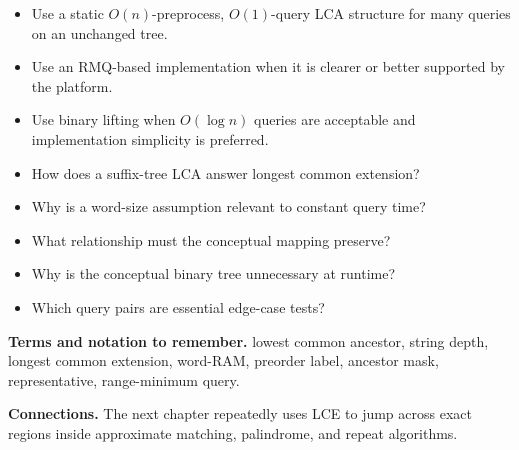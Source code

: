 \documentclass[11pt]{article}
\begin{document}
\begin{tcolorbox}[enhanced,breakable,title={Algorithm selection / when to use this},
  colback=Primary!3,colframe=Primary,fonttitle=\small\sffamily\bfseries,fontupper=\footnotesize,
  boxsep=0.6mm,left=1.5mm,right=1.5mm,top=1mm,bottom=1mm,before skip=3pt,after skip=3pt]
\begin{itemize}
  \item Use a static $O(n)$-preprocess, $O(1)$-query LCA structure for many queries on an unchanged tree.
  \item Use an RMQ-based implementation when it is clearer or better supported by the platform.
  \item Use binary lifting when $O(\log n)$ queries are acceptable and implementation simplicity is preferred.
\end{itemize}
\end{tcolorbox}

\begin{tcolorbox}[enhanced,breakable,title={Self-test questions},
  colback=white,colframe=Accent,fonttitle=\small\sffamily\bfseries,fontupper=\footnotesize,
  boxsep=0.6mm,left=1.5mm,right=1.5mm,top=1mm,bottom=1mm,before skip=3pt,after skip=3pt]
\begin{itemize}
  \item How does a suffix-tree LCA answer longest common extension?
  \item Why is a word-size assumption relevant to constant query time?
  \item What relationship must the conceptual mapping preserve?
  \item Why is the conceptual binary tree unnecessary at runtime?
  \item Which query pairs are essential edge-case tests?
\end{itemize}
\end{tcolorbox}

{\footnotesize
\textbf{Terms and notation to remember.} lowest common ancestor, string depth, longest common extension, word-RAM, preorder label, ancestor mask, representative, range-minimum query.

\textbf{Connections.} The next chapter repeatedly uses LCE to jump across exact regions inside approximate matching, palindrome, and repeat algorithms.
}
\end{document}
